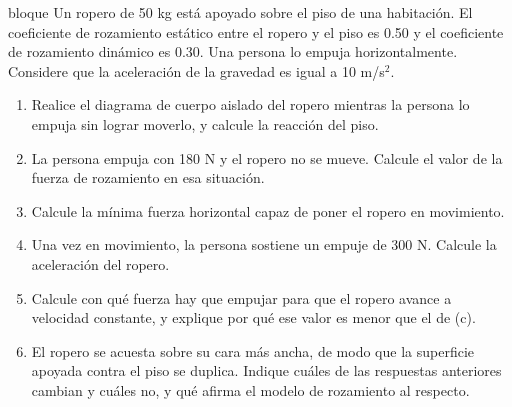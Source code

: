 \documentclass[11pt,openany]{book}
\begin{document}
\begin{ejercicio}{bloque}
Un ropero de 50 kg está apoyado sobre el piso de una habitación. El coeficiente de rozamiento estático entre el ropero y el piso es 0.50 y el coeficiente de rozamiento dinámico es 0.30. Una persona lo empuja horizontalmente. Considere que la aceleración de la gravedad es igual a 10 m/s$^2$.
\begin{enumerate}[label=(\alph*), leftmargin=1.7em, itemsep=1pt, topsep=3pt]
  \item Realice el diagrama de cuerpo aislado del ropero mientras la persona lo empuja sin lograr moverlo, y calcule la reacción del piso.
  \item La persona empuja con 180 N y el ropero no se mueve. Calcule el valor de la fuerza de rozamiento en esa situación.
  \item Calcule la mínima fuerza horizontal capaz de poner el ropero en movimiento.
  \item Una vez en movimiento, la persona sostiene un empuje de 300 N. Calcule la aceleración del ropero.
  \item Calcule con qué fuerza hay que empujar para que el ropero avance a velocidad constante, y explique por qué ese valor es menor que el de (c).
  \item El ropero se acuesta sobre su cara más ancha, de modo que la superficie apoyada contra el piso se duplica. Indique cuáles de las respuestas anteriores cambian y cuáles no, y qué afirma el modelo de rozamiento al respecto.
\end{enumerate}
\end{ejercicio}
\end{document}
